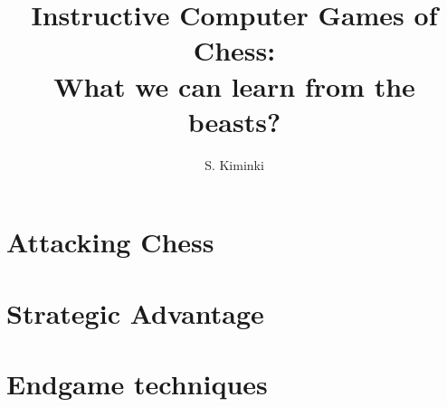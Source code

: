 \documentclass[a4paper,11pt,twocolumn]{report}
\title{Instructive Computer Games of Chess:\\What we can learn from the beasts?}
\author{S. Kiminki}
\begin{document}
\maketitle

\chapter{Attacking Chess}





\chapter{Strategic Advantage}



\chapter{Endgame techniques}




\end{document}
